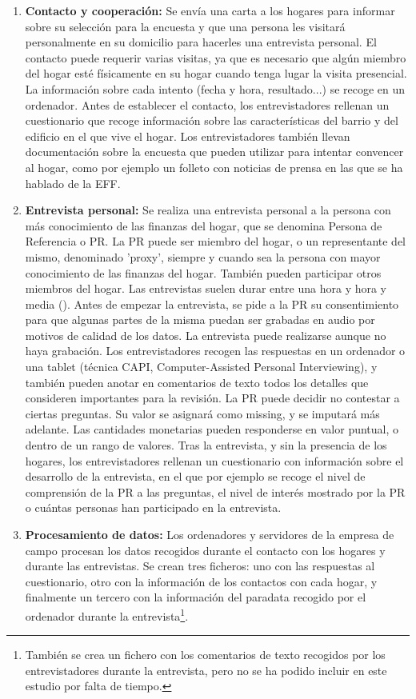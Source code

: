 \begin{enumerate}[noitemsep]
    \item \textbf{Contacto y cooperación:} Se envía una carta a los hogares para informar sobre su selección para la encuesta y que una persona les visitará personalmente en su domicilio para hacerles una entrevista personal. El contacto puede requerir varias visitas, ya que es necesario que algún miembro del hogar esté físicamente en su hogar cuando tenga lugar la visita presencial. La información sobre cada intento (fecha y hora, resultado...) se recoge en un ordenador. Antes de establecer el contacto, los entrevistadores rellenan un cuestionario que recoge información sobre las características del barrio y del edificio en el que vive el hogar. Los entrevistadores también llevan documentación sobre la encuesta que pueden utilizar para intentar convencer al hogar, como por ejemplo un folleto con noticias de prensa en las que se ha hablado de la EFF.
    \item \textbf{Entrevista personal:} Se realiza una entrevista personal a la persona con más conocimiento de las finanzas del hogar, que se denomina Persona de Referencia o PR. La PR puede ser miembro del hogar, o un representante del mismo, denominado 'proxy', siempre y cuando sea la persona con mayor conocimiento de las finanzas del hogar. También pueden participar otros miembros del hogar. Las entrevistas suelen durar entre una hora y hora y media (\cite{effmethod2017}). Antes de empezar la entrevista, se pide a la PR su consentimiento para que algunas partes de la misma puedan ser grabadas en audio por motivos de calidad de los datos. La entrevista puede realizarse aunque no haya grabación. Los entrevistadores recogen las respuestas en un ordenador o una tablet (técnica CAPI, Computer-Assisted Personal Interviewing), y también pueden anotar en comentarios de texto todos los detalles que consideren importantes para la revisión. La PR puede decidir no contestar a ciertas preguntas. Su valor se asignará como missing, y se imputará más adelante. Las cantidades monetarias pueden responderse en valor puntual, o dentro de un rango de valores. Tras la entrevista, y sin la presencia de los hogares, los entrevistadores rellenan un cuestionario con información sobre el desarrollo de la entrevista, en el que por ejemplo se recoge el nivel de comprensión de la PR a las preguntas, el nivel de interés mostrado por la PR o cuántas personas han participado en la entrevista.
    \item \textbf{Procesamiento de datos:} Los ordenadores y servidores de la empresa de campo procesan los datos recogidos durante el contacto con los hogares y durante las entrevistas. Se crean tres ficheros: uno con las respuestas al cuestionario, otro con la información de los contactos con cada hogar, y finalmente un tercero con la información del paradata recogido por el ordenador durante la entrevista\footnote{También se crea un fichero con los comentarios de texto recogidos por los entrevistadores durante la entrevista, pero no se ha podido incluir en este estudio por falta de tiempo.}.

\end{enumerate}
